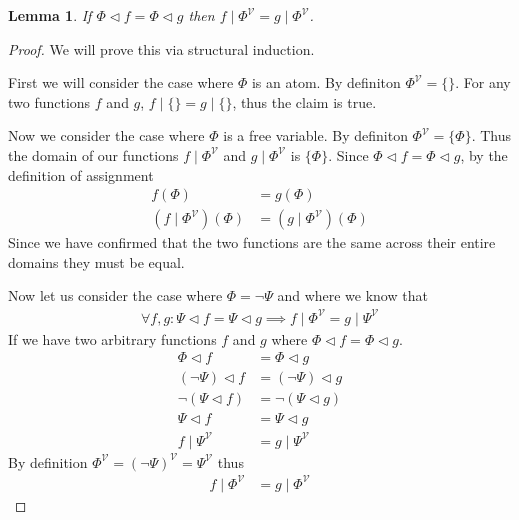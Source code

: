 \documentclass{article}
\newtheorem{lem}{Lemma}
\begin{document}
\begin{lem}
If $\Phi \lhd f = \Phi \lhd g$ then $f \mid \Phi^\mathcal{V} = g \mid \Phi^\mathcal{V}$.
\end{lem}
\begin{proof}
We will prove this via structural induction.

First we will consider the case where $\Phi$ is an atom.
By definiton $\Phi^\mathcal{V} = \{\}$.
For any two functions $f$ and $g$, $f \mid \{\} = g \mid \{\}$,
thus the claim is true.

Now we consider the case where $\Phi$ is a free variable.
By definiton $\Phi^\mathcal{V} = \{\Phi\}$.
Thus the domain of our functions $f\mid\Phi^\mathcal{V}$ and $g\mid\Phi^\mathcal{V}$ is $\{\Phi\}$.
Since $\Phi \lhd f = \Phi \lhd g$, by the definition of assignment
\begin{align*}
f(\Phi) &= g(\Phi) \\
(f\mid\Phi^\mathcal{V})(\Phi) &= (g\mid\Phi^\mathcal{V})(\Phi)
\end{align*}
Since we have confirmed that the two functions are the same across their entire domains they must be equal.

Now let us consider the case where $\Phi = \neg \Psi$ and where we know that
\begin{align*}
\forall f,g: \Psi \lhd f = \Psi \lhd g \implies f\mid\Phi^\mathcal{V}=g\mid\Psi^\mathcal{V}
\end{align*}
If we have two arbitrary functions $f$ and $g$ where $\Phi\lhd f=\Phi\lhd g$.
\begin{align*}
\Phi\lhd f        &= \Phi\lhd g      \\
(\neg\Psi)\lhd f &= (\neg\Psi)\lhd g \\
\neg(\Psi\lhd f) &= \neg(\Psi\lhd g) \\
\Psi\lhd f &= \Psi\lhd g             \\
f\mid\Psi^\mathcal{V} &= g\mid\Psi^\mathcal{V}
\end{align*}
By definition $\Phi^\mathcal{V} = (\neg\Psi)^\mathcal{V} = \Psi^\mathcal{V}$ thus
\begin{align*}
f\mid\Phi^\mathcal{V} &= g\mid\Phi^\mathcal{V}
\end{align*}


\end{proof}
\end{document}
